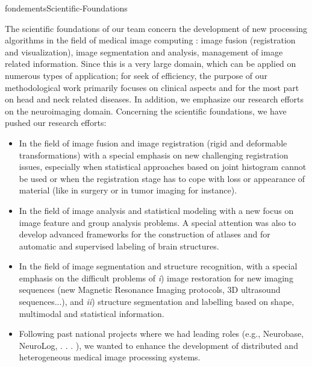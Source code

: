 \documentclass{ra2018}
\begin{document}

        \begin{module}{fondements}{Scientific-Foundations}{}
        
        The scientific foundations of our team concern the  development of new
        processing algorithms in the field of medical image computing : image fusion
        (registration and visualization), image segmentation and analysis, management
        of image related information. Since this is a very large domain, which can
        be applied on numerous types of application; for seek of efficiency, the purpose of
        our methodological work primarily focuses on clinical aspects and for the most
        part on head and neck related diseases. In addition, we emphasize our research
        efforts on the neuroimaging domain. Concerning the scientific foundations, we
        have  pushed our research efforts: 
        
        \begin{itemize}
          \item In the field of image fusion and image registration (rigid and
          deformable transformations) with a special emphasis on new challenging
          registration issues, especially when statistical approaches based on joint
          histogram cannot be used or when the registration stage has to cope with loss
          or appearance of material (like in surgery or in tumor imaging for instance).  
          \item In the field of image analysis and statistical modeling with a new
          focus on image feature and group analysis problems. A special attention was
          also to develop advanced frameworks for the construction of atlases and for
          automatic and supervised labeling of brain structures. 
          \item In the field of image segmentation and structure recognition, with a
          special emphasis on the difficult problems of \emph{i}) image restoration for
          new imaging sequences (new Magnetic Resonance Imaging protocols, 3D
          ultrasound sequences...), and \emph{ii}) structure segmentation and labelling
          based on shape, multimodal and statistical information.
          \item Following past national projects where we had leading roles (e.g., Neurobase, NeuroLog,
        . . . ), we wanted to enhance the development of distributed and heterogeneous medical image
        processing systems.
        \end{itemize}
        

\end{module}
\end{document}
